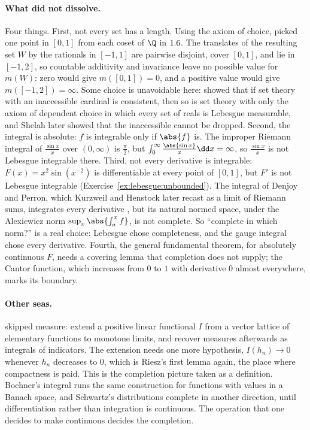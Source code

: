 \begin{refsection}
\paragraph{What did not dissolve.} Four things. First, not every set has a length. Using the axiom of choice, \textcite{Vitali1905} picked one point in $[0,1]$ from each coset of $\Q$ in $1.6$. The translates of the resulting set $W$ by the rationals in $[-1,1]$ are pairwise disjoint, cover $[0,1]$, and lie in $[-1,2]$, so countable additivity and invariance leave no possible value for $m(W)$: zero would give $m([0,1])=0$, and a positive value would give $m([-1,2])=\infty$. Some choice is unavoidable here: \textcite{Solovay1970} showed that if set theory with an inaccessible cardinal is consistent, then so is set theory with only the axiom of dependent choice in which every set of reals is Lebesgue measurable, and Shelah later showed that the inaccessible cannot be dropped. Second, the integral is absolute: $f$ is integrable only if $\abs{f}$ is. The improper Riemann integral of $\frac{\sin x}{x}$ over $(0,\infty)$ is $\frac\pi2$, but $\int_0^\infty\frac{\abs{\sin x}}{x}\dd x=\infty$, so $\frac{\sin x}{x}$ is not Lebesgue integrable there. Third, not every derivative is integrable: $F(x)=x^2\sin(x^{-2})$ is differentiable at every point of $[0,1]$, but $F'$ is not Lebesgue integrable (Exercise~\ref{ex:lebesgue:unbounded}). The integral of Denjoy and Perron, which Kurzweil and Henstock later recast as a limit of Riemann sums, integrates every derivative \parencite{Bartle2001}, but its natural normed space, under the Alexiewicz norm $\sup_x\abs{\int_a^xf}$, is not complete. So ``complete in which norm?'' is a real choice: Lebesgue chose completeness, and the gauge integral chose every derivative. Fourth, the general fundamental theorem, for absolutely continuous $F$, needs a covering lemma that completion does not supply; the Cantor function, which increases from $0$ to $1$ with derivative $0$ almost everywhere, marks its boundary.

\paragraph{Other seas.} \textcite{Daniell1918} skipped measure: extend a positive linear functional $I$ from a vector lattice of elementary functions to monotone limits, and recover measures afterwards as integrals of indicators. The extension needs one more hypothesis, $I(h_n)\to0$ whenever $h_n$ decreases to $0$, which is Riesz's first lemma again, the place where compactness is paid. This is the completion picture taken as a definition. Bochner's integral runs the same construction for functions with values in a Banach space, and Schwartz's distributions complete in another direction, until differentiation rather than integration is continuous. The operation that one decides to make continuous decides the completion.


\end{refsection}
